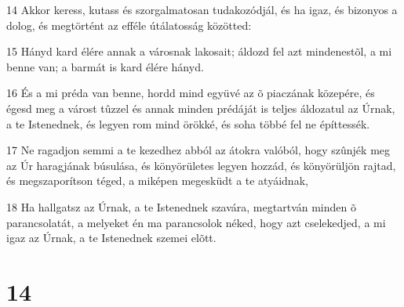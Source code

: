\par 14 Akkor keress, kutass és szorgalmatosan tudakozódjál, és ha igaz, és bizonyos a dolog, és megtörtént az efféle útálatosság közötted:
\par 15 Hányd kard élére annak a városnak lakosait; áldozd fel azt mindenestõl, a mi benne van; a barmát is kard élére hányd.
\par 16 És a mi préda van benne, hordd mind együvé az õ piaczának közepére, és égesd meg a várost tûzzel és annak minden prédáját is teljes áldozatul az Úrnak, a te Istenednek, és legyen rom mind örökké, és soha többé fel ne építtessék.
\par 17 Ne ragadjon semmi a te kezedhez abból az átokra valóból, hogy szûnjék meg az Úr haragjának búsulása, és könyörületes legyen hozzád, és könyörüljön rajtad, és megszaporítson téged, a miképen megesküdt a te atyáidnak,
\par 18 Ha hallgatsz az Úrnak, a te Istenednek szavára, megtartván minden õ parancsolatát, a melyeket én ma parancsolok néked, hogy azt cselekedjed, a mi igaz az Úrnak, a te Istenednek szemei elõtt.

\chapter{14}

